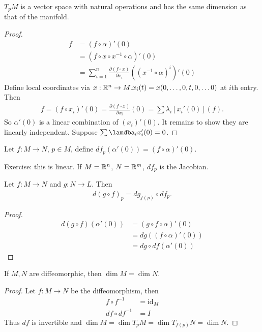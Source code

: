 \documentclass[12pt,class=article,crop=false]{standalone}
\begin{document}
 \begin{prop}
$ T_pM$ is a vector space with natural operations and has the same dimension as that of the manifold.
\end{prop}
\begin{proof}
\begin{align*}
	[ \alpha'(0)] f &= (f \circ \alpha)'(0) \\
	&= (f \circ x \circ x^{-1} \circ \alpha)'(0) \\
	&= \sum_{ i= 1}^{ n} \frac{ \partial (f \circ x)}{ \partial x_i} ((x^{-1} \circ \alpha)^{i} )'(0)
\end{align*}
Define local coordinates via $ x: \mathbb{R}^{n} \to M. x_i(t) = x(0,\ldots,0,t,0,\ldots0)$ at $ i$th entry. Then
 \begin{align*}
	 [x_i'(0)] f = (f \circ  x_i)'(0) = \frac{ \partial (f \circ x)}{ \partial x_i} (0)= \sum \lambda_i [x_i'(0)](f).
\end{align*}
So $ \alpha'(0)$ is a linear combination of $ (x_i)'(0)$. It remains to show they are linearly independent. Suppose $ \sum \lamdba_i x_i'(0) =0$.
\end{proof}

\begin{defn}
Let $ f: M \to N$, $ p \in M$, define $ df_p ( \alpha'(0)) = (f \circ \alpha)'(0)$.
\end{defn}
Exercise: this is linear. If $ M = \mathbb{R}^{n}$, $ N = \mathbb{R}^{m}$, $ df_p$ is the Jacobian.

\begin{thm}
Let $ f: M \to N$ and $ g: N \to L$. Then
\begin{align*}
	d(g \circ f) _p = dg_{f(p)} \circ df_p.
\end{align*}
\end{thm}
\begin{proof}
\begin{align*}
	d(g \circ f) ( \alpha'(0)) &= (g \circ f \circ \alpha)'(0) \\
	&= dg( (f\circ \alpha)'(0)) \\
	&= dg \circ df( \alpha'(0)) 
\end{align*}
\end{proof}

\begin{coro}
If $ M,N$ are diffeomorphic, then  $ \dim M = \dim N$.
\end{coro}
\begin{proof}
Let $ f:M \to N$ be the diffeomorphism, then
\begin{align*}
	f \circ f^{-1} &= \text{id}_M  \\
	df \circ df^{-1} &= I 
\end{align*}
Thus $ df$ is invertible and  $\dim M = \dim T_pM = \dim T_{f(p)}N = \dim N$.
\end{proof}
\end{document}
